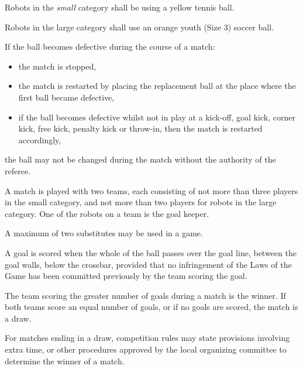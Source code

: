 \documentclass[12pt]{hurocup}
\begin{document}
\label{law:ball}

\begin{lawlist}
\item Robots in the \textit{small} category shall be using a yellow
 tennis ball.

\item Robots in the large category shall use an orange youth (Size 3)
soccer ball. 

\item If the ball becomes defective during the course of a match:
  \begin{itemize}
  \item the match is stopped,
  \item the match is restarted by placing the replacement ball at the place where the first ball became defective, 
  \item if the ball becomes defective whilst not in play at a
    kick-off, goal kick, corner kick, free kick, penalty kick or
    throw-in, then the match is restarted accordingly,
  \end{itemize}
\item the ball may not be changed during the match without the authority of the referee.

\end{lawlist}


\begin{lawlist}
\item A match is played with two teams, each consisting of not more
  than three players in the small category, and not more than two
  players for robots in the large category. One of the robots on a
  team is the goal keeper.
\item A maximum of two substitutes may be used in a game.
\end{lawlist}

\label{law:scoring}

\begin{lawlist}
  
\item A goal is scored when the whole of the ball passes over the goal
  line, between the goal walls, below the crossbar, provided that no
  infringement of the Laws of the Game has been committed previously
  by the team scoring the goal.
  
\item The team scoring the greater number of goals during a match is
  the winner. If both teams score an equal number of goals, or if no
  goals are scored, the match is a draw.
  
\item For matches ending in a draw, competition rules may state
  provisions involving extra time, or other procedures approved by the
  local organizing committee to determine the winner of a match.
\end{lawlist}
\end{document}
